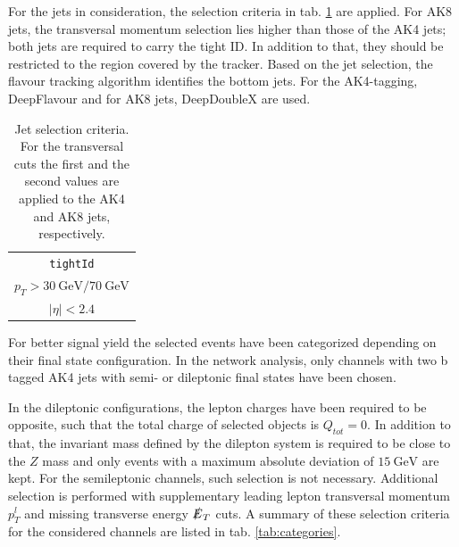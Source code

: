 For the jets in consideration, the selection criteria in tab. \ref{tab:jet_selection} are applied. For AK8 jets, the transversal momentum selection lies higher than those of the AK4 jets; both jets are required to carry the tight ID. In addition to that, they should be restricted to the region covered by the tracker. Based on the jet selection, the flavour tracking algorithm identifies the bottom jets. For the AK4-tagging, DeepFlavour and for AK8 jets, DeepDoubleX are used.

\begin{table}[h!]
	\centering
	\begin{tabular}{c}
		\hline
		\texttt{tightId} \\
		$p_T > \SI{30}{\giga\electronvolt}/ \SI{70}{\giga\electronvolt}$ \\
		$|\eta| < 2.4$ \\
		\hline
	\end{tabular}
	\caption{Jet selection criteria. For the transversal cuts the first and the second values are applied to the AK4 and AK8 jets, respectively.}
	\label{tab:jet_selection}
\end{table}


For better signal yield the selected events have been categorized depending on their final state configuration. In the network analysis, only channels with two b tagged AK4 jets with semi- or dileptonic final states have been chosen.

In the dileptonic configurations, the lepton charges have been required to be opposite, such that the total charge of selected objects is $Q_{tot} = 0$. In addition to that, the invariant mass defined by the dilepton system is required to be close to the $Z$ mass and only events with a maximum absolute deviation of $\SI{15}{\giga\electronvolt}$ are kept. For the semileptonic channels, such selection is not necessary. Additional selection is performed with supplementary leading lepton transversal momentum $p^l_T$ and missing transverse energy $\slashed{E}_T$ cuts. A summary of these selection criteria for the considered channels are listed in tab. \ref{tab:categories}.


